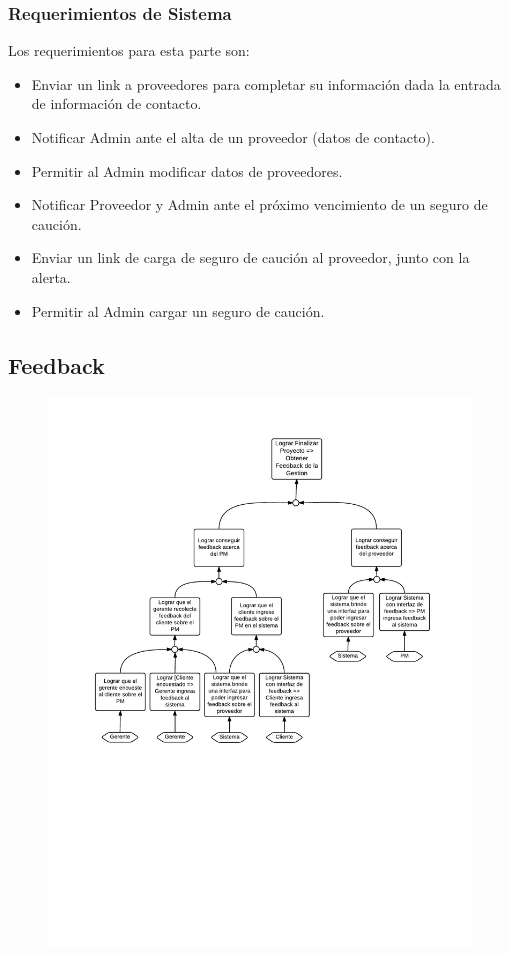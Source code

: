 \subsubsection{Requerimientos de Sistema}

Los requerimientos para esta parte son:
\begin{itemize}
	\item Enviar un link a proveedores para completar su información dada la entrada de información de contacto.
	\item Notificar Admin ante el alta de un proveedor (datos de contacto).
	\item Permitir al Admin modificar datos de proveedores.
	\item Notificar Proveedor y Admin ante el próximo vencimiento de un seguro de caución.
	\item Enviar un link de carga de seguro de caución al proveedor, junto con la alerta.
	\item Permitir al Admin cargar un seguro de caución.
\end{itemize}

\newpage
\subsection{Feedback}
\begin{figure}[H]
\includegraphics[width=\textwidth, clip=true, trim=15pt 290pt 15pt 40pt]{imagenes/objetivos/objetivos17.pdf}
\end{figure}

